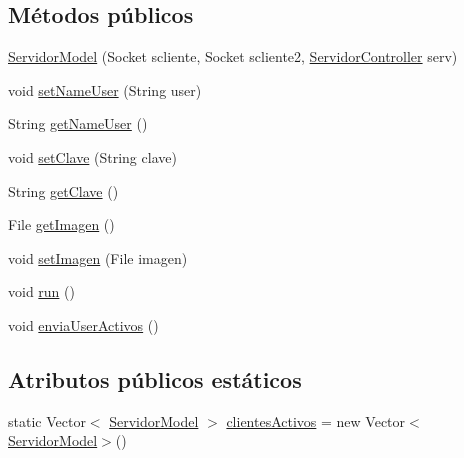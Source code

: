 \subsection*{Métodos públicos}
\begin{DoxyCompactItemize}
\item 
\hyperlink{classcom_1_1ucab_1_1javachat_1_1_servidor_1_1model_1_1_servidor_model_aa0ce2b6483d9538d362f45e2ff7e7263}{Servidor\-Model} (Socket scliente, Socket scliente2, \hyperlink{classcom_1_1ucab_1_1javachat_1_1_servidor_1_1controller_1_1_servidor_controller}{Servidor\-Controller} serv)
\item 
void \hyperlink{classcom_1_1ucab_1_1javachat_1_1_servidor_1_1model_1_1_servidor_model_a21f82e0d41c53cb292a639e580e5eb59}{set\-Name\-User} (String user)
\item 
String \hyperlink{classcom_1_1ucab_1_1javachat_1_1_servidor_1_1model_1_1_servidor_model_aad88766777b8f162d8ee92ba5de47fee}{get\-Name\-User} ()
\item 
void \hyperlink{classcom_1_1ucab_1_1javachat_1_1_servidor_1_1model_1_1_servidor_model_a72058125b761c7703bad54a8bec5c25a}{set\-Clave} (String clave)
\item 
String \hyperlink{classcom_1_1ucab_1_1javachat_1_1_servidor_1_1model_1_1_servidor_model_a41c2949a837481f36ee9cb7b3c77dd80}{get\-Clave} ()
\item 
File \hyperlink{classcom_1_1ucab_1_1javachat_1_1_servidor_1_1model_1_1_servidor_model_aa0cf65003f403b8a0c6f1e9032c853b9}{get\-Imagen} ()
\item 
void \hyperlink{classcom_1_1ucab_1_1javachat_1_1_servidor_1_1model_1_1_servidor_model_a12e272b5a7e681f61b9f10e40a88d2f7}{set\-Imagen} (File imagen)
\item 
void \hyperlink{classcom_1_1ucab_1_1javachat_1_1_servidor_1_1model_1_1_servidor_model_af0b98666d6d12da06af6b540e0c873ba}{run} ()
\item 
void \hyperlink{classcom_1_1ucab_1_1javachat_1_1_servidor_1_1model_1_1_servidor_model_abfffc25f39d081dff7523f899a3786f5}{envia\-User\-Activos} ()
\end{DoxyCompactItemize}
\subsection*{Atributos públicos estáticos}
\begin{DoxyCompactItemize}
\item 
static Vector$<$ \hyperlink{classcom_1_1ucab_1_1javachat_1_1_servidor_1_1model_1_1_servidor_model}{Servidor\-Model} $>$ \hyperlink{classcom_1_1ucab_1_1javachat_1_1_servidor_1_1model_1_1_servidor_model_ab9706c2f3385f6220488155d97e530c1}{clientes\-Activos} = new Vector$<$\hyperlink{classcom_1_1ucab_1_1javachat_1_1_servidor_1_1model_1_1_servidor_model}{Servidor\-Model}$>$()
\end{DoxyCompactItemize}


